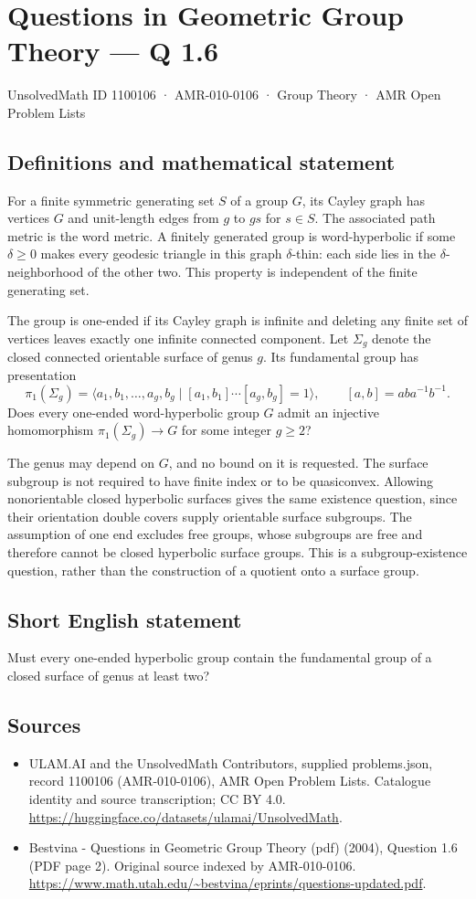 \documentclass[11pt,a4paper]{article}
\begin{document}
\section*{Questions in Geometric Group Theory — Q 1.6}\label{1100106}
{\small UnsolvedMath ID 1100106 · AMR-010-0106 · Group Theory · AMR Open Problem Lists}
\subsection{Definitions and mathematical statement}
For a finite symmetric generating set $S$ of a group $G$, its Cayley graph has vertices $G$ and unit-length edges from $g$ to $gs$ for $s\in S$. The associated path metric is the word metric. A finitely generated group is word-hyperbolic if some $\delta\geq0$ makes every geodesic triangle in this graph $\delta$-thin: each side lies in the $\delta$-neighborhood of the other two. This property is independent of the finite generating set.

The group is one-ended if its Cayley graph is infinite and deleting any finite set of vertices leaves exactly one infinite connected component. Let $\Sigma_g$ denote the closed connected orientable surface of genus $g$. Its fundamental group has presentation
\[
 \pi_1(\Sigma_g)=\langle a_1,b_1,\ldots,a_g,b_g\mid
                  [a_1,b_1]\cdots[a_g,b_g]=1\rangle,
 \qquad [a,b]=aba^{-1}b^{-1}.
\]
Does every one-ended word-hyperbolic group $G$ admit an injective homomorphism $\pi_1(\Sigma_g)\to G$ for some integer $g\geq2$?

The genus may depend on $G$, and no bound on it is requested. The surface subgroup is not required to have finite index or to be quasiconvex. Allowing nonorientable closed hyperbolic surfaces gives the same existence question, since their orientation double covers supply orientable surface subgroups. The assumption of one end excludes free groups, whose subgroups are free and therefore cannot be closed hyperbolic surface groups. This is a subgroup-existence question, rather than the construction of a quotient onto a surface group.
\subsection{Short English statement}
Must every one-ended hyperbolic group contain the fundamental group of a closed surface of genus at least two?
\subsection{Sources}
\begin{itemize}
\item[S1] ULAM.AI and the UnsolvedMath Contributors, supplied problems.json, record 1100106 (AMR-010-0106), AMR Open Problem Lists. Catalogue identity and source transcription; CC BY 4.0.
\url{https://huggingface.co/datasets/ulamai/UnsolvedMath}.
\item[S2] Bestvina - Questions in Geometric Group Theory (pdf) (2004), Question 1.6 (PDF page 2). Original source indexed by AMR-010-0106.
\url{https://www.math.utah.edu/~bestvina/eprints/questions-updated.pdf}.
\end{itemize}
\end{document}
